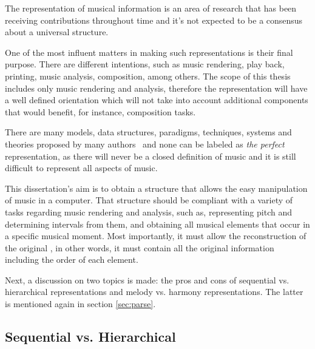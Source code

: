 The representation of musical information is an area of research that has been receiving
contributions throughout time and it's not expected to be a consensus about a universal structure.

One of the most influent matters in making such representations is their final purpose. There are
different intentions, such as music rendering, play back, printing, music analysis, composition,
among others. The scope of this thesis includes only music rendering and analysis, therefore the
representation will have a well defined orientation which will not take into account additional
components that would benefit, for instance, composition tasks.

There are many models, data structures, paradigms, techniques, systems and theories proposed by many
authors~\cite{Brinkman1984,Buxton1978,Bilmes1992,Smaill1993,Wiggins1989,Dannenberg1993} and none can
be labeled as \emph{the perfect} representation, as there will never be a closed definition of
music and it is still difficult to represent all aspects of music.


This dissertation's aim is to obtain a structure that allows the easy manipulation of music in a
computer. That structure should be compliant with a variety of tasks regarding music rendering and
analysis, such as, representing pitch and determining intervals from them, and obtaining all musical
elements that occur in a specific musical moment. Most importantly, it must allow the reconstruction
of the original \abc{}, in other words, it must contain all the original information including the
order of each element.

Next, a discussion on two topics is made: the pros and cons of sequential vs. hierarchical
representations and melody vs. harmony representations. The latter is mentioned again in section
\ref{sec:parse}.

\subsection{Sequential vs. Hierarchical}

